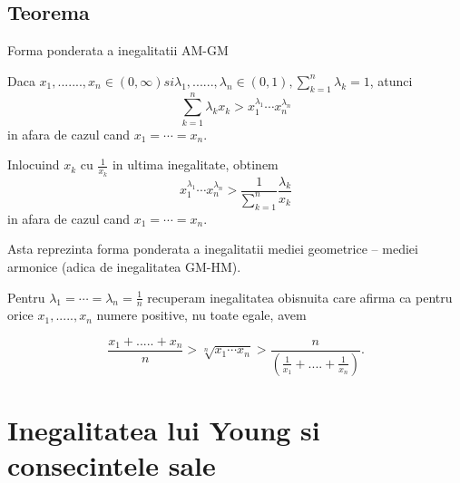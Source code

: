 \documentclass[a4paper,12pt,oneside]{report}
\begin{document}
\subsection{Teorema}
Forma ponderata a inegalitatii AM-GM

Daca \(x_{1},.......,x_{n}\in \left ( 0,\infty  \right ) si \lambda_{1},......,\lambda _{n} \in \left ( 0 , 1 \right ), \sum_{k = 1}^{n}\lambda _{k}= 1\), atunci
\begin{displaymath}
  \sum_{k = 1}^{n}\lambda _{k}x_{k}> x_{1}^{\lambda _{1}}\cdots x_{n}^{\lambda _{n}}
\end{displaymath}
in afara de cazul cand \(x_{1} = \cdots = x_{n}\). 
	
	Inlocuind \(x_{k}\) cu \(\frac{1}{x_{k} }\) in ultima inegalitate, obtinem 
\begin{displaymath}
  x_{1}^{\lambda _{1}}\cdots x_{n}^{\lambda _{n}}> \frac{1}{\sum_{k = 1}^{n}}\frac{\lambda _{k}}{x_{k}}
\end{displaymath}
in afara de cazul cand \(x_{1} = \cdots = x_{n}\). 

Asta reprezinta forma ponderata a inegalitatii mediei geometrice – mediei armonice (adica de inegalitatea GM-HM). 

Pentru \(\lambda _{1} = \cdots =\lambda _{n}= \frac{1}{n}\) recuperam inegalitatea obisnuita care afirma ca pentru orice \(x_{1},.....,x_{n}\)  numere positive, nu toate egale, avem

\begin{displaymath}
  \frac{x_{1}+.....+x_{n}}{n}> \sqrt[n]{x_{1}\cdots x_{n}}> \frac{n}{\left ( \frac{1}{x_{1}}+....+\frac{1}{x_{n}} \right )}. 
\end{displaymath}




\section{Inegalitatea lui Young si consecintele sale}
\end{document}
